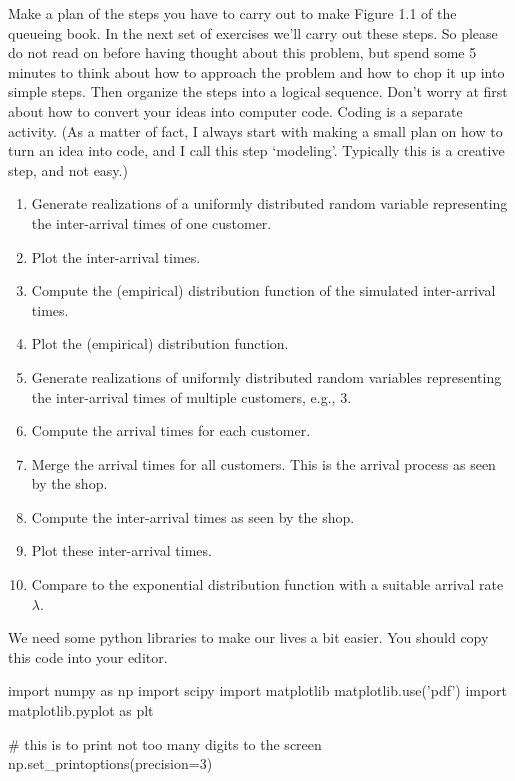 \begin{exercise}
  Make a plan of the steps you have to carry out to make Figure 1.1 of the queueing book.
  In the next set of exercises we'll carry out these steps.
  So please do not read on before having thought about this problem, but spend some 5 minutes to think about how to approach the problem and how to chop it up into simple steps.
  Then organize the steps into a logical sequence.
  Don't worry at first about how to convert your ideas into computer code.
  Coding is a separate activity.
  (As a matter of fact, I always start with making a small plan on how to turn an idea into code, and I call this step `modeling'.
  Typically this is a creative step, and not easy.)

  \begin{solution}
    \begin{enumerate}
    \item Generate realizations of a uniformly distributed random variable representing the inter-arrival times of one customer.
    \item Plot the inter-arrival times.
    \item Compute the (empirical) distribution function of the simulated inter-arrival times.
    \item Plot the (empirical) distribution function.
    \item Generate realizations of uniformly distributed random variables representing the inter-arrival times of multiple customers, e.g., 3. 
    \item Compute the arrival times for each customer.
    \item Merge  the arrival times for all customers. This is the arrival process as seen by the shop.
    \item Compute the inter-arrival times as seen by the shop.
    \item Plot these inter-arrival times.
    \item Compare to the exponential distribution function with a suitable arrival rate $\lambda$. 
    \end{enumerate}
  \end{solution}
\end{exercise}

We need some python libraries to make our lives a bit easier. You should copy this code into your editor.

\begin{pyblock}
import numpy as np
import scipy
import matplotlib
matplotlib.use('pdf') 
import matplotlib.pyplot as plt

# this is to print not too many digits to the screen
np.set_printoptions(precision=3) 
\end{pyblock}


